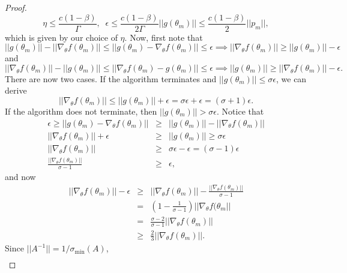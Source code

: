 \begin{proof}
\begin{equation}
    \eta \leq \frac{c(1-\beta)}{\Gamma}, \;\; \epsilon \leq \frac{c(1-\beta)}{2\Gamma}||g(\theta_m)|| \leq \frac{c(1-\beta)}{2}||p_m||,
\end{equation}
which is given by our choice of $\eta$.
Now, first note that
\begin{equation}
||g(\theta_m)|| - ||\nabla_\theta f(\theta_m)|| \leq ||g(\theta_m) - \nabla_\theta f(\theta_m)|| \leq \epsilon \implies ||\nabla_\theta f(\theta_m)|| \geq ||g(\theta_m)|| - \epsilon
\end{equation} 
and
\begin{equation}
||\nabla_\theta f(\theta_m)||-||g(\theta_m)|| \leq ||\nabla_\theta f(\theta_m)-g(\theta_m)|| \leq \epsilon \implies ||g(\theta_m)|| \geq ||\nabla_\theta f(\theta_m)|| - \epsilon.
\end{equation}
There are now two cases. 
If the algorithm terminates and $||g(\theta_m)|| \leq \sigma \epsilon$, we can derive 
\begin{equation}
    ||\nabla_\theta f(\theta_m)|| \leq ||g(\theta_m)|| + \epsilon = \sigma\epsilon+\epsilon = (\sigma+1)\epsilon.
\end{equation}
If the algorithm does not terminate, then $||g(\theta_m)|| > \sigma \epsilon$. 
Notice that 
\begin{eqnarray}
    \epsilon \geq ||g(\theta_m) - \nabla_\theta f(\theta_m)|| &\geq& ||g(\theta_m)|| - ||\nabla_\theta f(\theta_m)|| 
    \\
    ||\nabla_\theta f(\theta_m)|| + \epsilon &\geq& ||g(\theta_m)|| \geq \sigma \epsilon 
    \\
    ||\nabla_\theta f(\theta_m)|| &\geq& \sigma \epsilon - \epsilon = (\sigma - 1)\epsilon 
    \\
    \frac{||\nabla_\theta f(\theta_m)||}{\sigma-1} &\geq& \epsilon,
\end{eqnarray}
and now 
\begin{eqnarray}
    ||\nabla_\theta f(\theta_m)|| - \epsilon
    &\geq&  ||\nabla_\theta f(\theta_m)|| - \frac{||\nabla_\theta f(\theta_m)||}{\sigma-1} 
    \\
    &=& \left(1-\frac{1}{\sigma-1}\right)||\nabla_\theta f(\theta_m|| 
    \\
    &=& \frac{\sigma-2}{\sigma-1}||\nabla_\theta f(\theta_m)|| 
    \\
    &\geq& \frac{2}{3}||\nabla_\theta f(\theta_m)||.
\end{eqnarray}
Since $||A^{-1}|| = 1/\sigma_{\min}(A)$,
\begin{align}

\end{align}
\end{proof}
